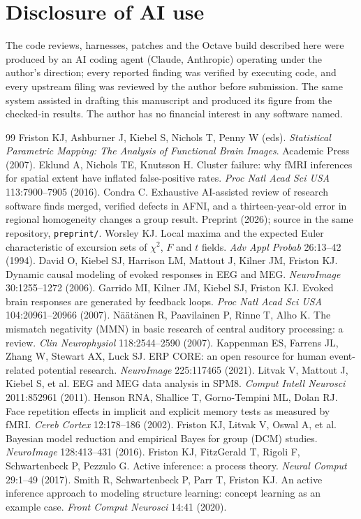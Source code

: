 \documentclass[11pt]{article}
\newcommand{\code}[1]{\texttt{#1}}
\begin{document}
\section*{Disclosure of AI use}
The code reviews, harnesses, patches and the Octave build described here were produced by an AI coding agent (Claude, Anthropic) operating under the author's direction; every reported finding was verified by executing code, and every upstream filing was reviewed by the author before submission. The same system assisted in drafting this manuscript and produced its figure from the checked-in results. The author has no financial interest in any software named.

\begin{thebibliography}{99}
 Friston KJ, Ashburner J, Kiebel S, Nichols T, Penny W (eds). \emph{Statistical Parametric Mapping: The Analysis of Functional Brain Images}. Academic Press (2007).
 Eklund A, Nichols TE, Knutsson H. Cluster failure: why fMRI inferences for spatial extent have inflated false-positive rates. \emph{Proc Natl Acad Sci USA} 113:7900--7905 (2016).
 Condra C. Exhaustive AI-assisted review of research software finds merged, verified defects in AFNI, and a thirteen-year-old error in regional homogeneity changes a group result. Preprint (2026); source in the same repository, \code{preprint/}.
 Worsley KJ. Local maxima and the expected Euler characteristic of excursion sets of $\chi^2$, $F$ and $t$ fields. \emph{Adv Appl Probab} 26:13--42 (1994).
 David O, Kiebel SJ, Harrison LM, Mattout J, Kilner JM, Friston KJ. Dynamic causal modeling of evoked responses in EEG and MEG. \emph{NeuroImage} 30:1255--1272 (2006).
 Garrido MI, Kilner JM, Kiebel SJ, Friston KJ. Evoked brain responses are generated by feedback loops. \emph{Proc Natl Acad Sci USA} 104:20961--20966 (2007).
 N\"a\"at\"anen R, Paavilainen P, Rinne T, Alho K. The mismatch negativity (MMN) in basic research of central auditory processing: a review. \emph{Clin Neurophysiol} 118:2544--2590 (2007).
 Kappenman ES, Farrens JL, Zhang W, Stewart AX, Luck SJ. ERP CORE: an open resource for human event-related potential research. \emph{NeuroImage} 225:117465 (2021).
 Litvak V, Mattout J, Kiebel S, et al. EEG and MEG data analysis in SPM8. \emph{Comput Intell Neurosci} 2011:852961 (2011).
 Henson RNA, Shallice T, Gorno-Tempini ML, Dolan RJ. Face repetition effects in implicit and explicit memory tests as measured by fMRI. \emph{Cereb Cortex} 12:178--186 (2002).
 Friston KJ, Litvak V, Oswal A, et al. Bayesian model reduction and empirical Bayes for group (DCM) studies. \emph{NeuroImage} 128:413--431 (2016).
 Friston KJ, FitzGerald T, Rigoli F, Schwartenbeck P, Pezzulo G. Active inference: a process theory. \emph{Neural Comput} 29:1--49 (2017).
 Smith R, Schwartenbeck P, Parr T, Friston KJ. An active inference approach to modeling structure learning: concept learning as an example case. \emph{Front Comput Neurosci} 14:41 (2020).
\end{thebibliography}
\end{document}
